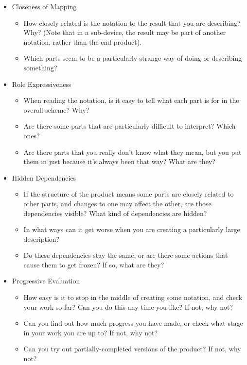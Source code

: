 \begin{itemize}
    \item Closeness of Mapping
        \begin{itemize}
        \item How closely related is the notation to the result that you are describing? Why? (Note that in a sub-device, the result may be part of another notation, rather than the end product).
        \item Which parts seem to be a particularly strange way of doing or describing something?
        \end{itemize}
    \item Role Expressiveness
        \begin{itemize}
        \item When reading the notation, is it easy to tell what each part is for in the overall scheme? Why?
        \item Are there some parts that are particularly difficult to interpret? Which ones?
        \item Are there parts that you really don’t know what they mean, but you put them in just because it’s always been that
way? What are they?
        \end{itemize}
    \item Hidden Dependencies
        \begin{itemize}
        \item If the structure of the product means some parts are closely related to other parts, and changes to one may affect the other, are those dependencies visible? What kind of dependencies are hidden?
        \item In what ways can it get worse when you are creating a particularly large description?
        \item Do these dependencies stay the same, or are there some actions that cause them to get frozen? If so, what are they?
        \end{itemize}
    \item Progressive Evaluation
        \begin{itemize}
        \item How easy is it to stop in the middle of creating some notation, and check your work so far? Can you do this any time you like? If not, why not?
        \item Can you find out how much progress you have made, or check what stage in your work you are up to? If not, why not?
        \item Can you try out partially-completed versions of the product? If not, why not?

\end{itemize}
\end{itemize}
